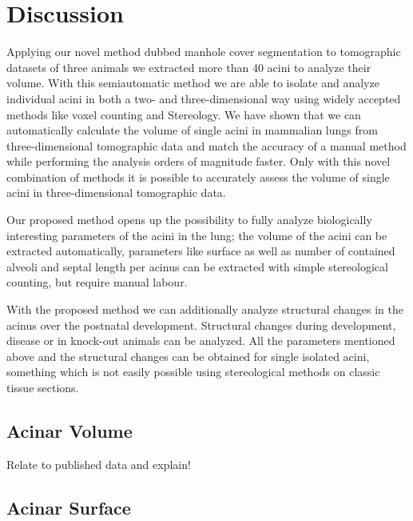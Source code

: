 \documentclass[%
	twoside,
	paper=a4,%
	abstract=true,%
	]{scrartcl}
\begin{document}
\section{Discussion}
Applying our novel method dubbed manhole cover segmentation to tomographic datasets of three animals we extracted more than 40 acini to analyze their volume. With this semiautomatic method we are able to isolate and analyze individual acini in both a two- and three-dimensional way using widely accepted methods like voxel counting and Stereology. We have shown that we can automatically calculate the volume of single acini in mammalian lungs from three-dimensional tomographic data and match the accuracy of a manual method while performing the analysis orders of magnitude faster. Only with this novel combination of methods it is possible to accurately assess the volume of single acini in three-dimensional tomographic data.

Our proposed method opens up the possibility to fully analyze biologically interesting parameters of the acini in the lung; the volume of the acini can be extracted automatically, parameters like surface as well as number of contained alveoli and septal length per acinus can be extracted with simple stereological counting, but require manual labour.

With the proposed method we can additionally analyze structural changes in the acinus over the postnatal development. Structural changes during development, disease or in knock-out animals can be analyzed. All the parameters mentioned above and the structural changes can be obtained for single isolated acini, something which is not easily possible using stereological methods on classic tissue sections.

\subsection{Acinar Volume}
Relate to published data and explain!

\subsection{Acinar Surface}
\end{document}
